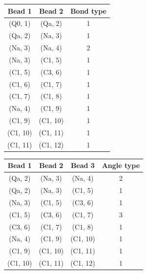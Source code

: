 \documentclass[
    11pt,
    a4paper,
    oneside,        %
    BCOR=10mm,      %
    parskip=half,   %
    listof=nototoc,   %
    bibliography=totoc %
]{scrreprt}
\begin{document}
\begin{table}[t]
    \centering
    
    \begin{minipage}[t]{0.48\textwidth}\vspace{0pt}
        \begin{tabular}{ccc}
            \toprule
            Bead 1 & Bead 2 & Bond type \\
            \midrule
            (Q0, 1) & (Qa, 2) & 1\\
            (Qa, 2) & (Na, 3) & 1\\
            (Na, 3) & (Na, 4) & 2\\
            (Na, 3) & (C1, 5) & 1\\
            (C1, 5) & (C3, 6) & 1\\
            (C1, 6) & (C1, 7) & 1\\
            (C1, 7) & (C1, 8) & 1\\
            (Na, 4) & (C1, 9) & 1\\
            (C1, 9) & (C1, 10) & 1\\
            (C1, 10) & (C1, 11) & 1\\
            (C1, 11) & (C1, 12) & 1\\
            \bottomrule
        \end{tabular}
        \subcaption{}
    \end{minipage}%
    \hfill 
    \begin{minipage}[t]{0.48\textwidth}\vspace{0pt}
        \begin{tabular}{cccc}
            \toprule
            Bead 1 & Bead 2 & Bead 3 & Angle type \\
            \midrule
            (Qa, 2) & (Na, 3) & (Na, 4) & 2\\
            (Qa, 2) & (Na, 3) & (C1, 5) & 1\\
            (Na, 3) & (C1, 5) & (C3, 6) & 1\\
            (C1, 5) & (C3, 6) & (C1, 7) & 3\\
            (C3, 6) & (C1, 7) & (C1, 8) & 1\\
            (Na, 4) & (C1, 9) & (C1, 10) & 1\\
            (C1, 9) & (C1, 10) & (C1, 11) & 1\\
            (C1, 10) & (C1, 11) & (C1, 12) & 1\\
            \bottomrule
        \end{tabular}
        \subcaption{}
    \end{minipage}
    

\end{table}
\end{document}
